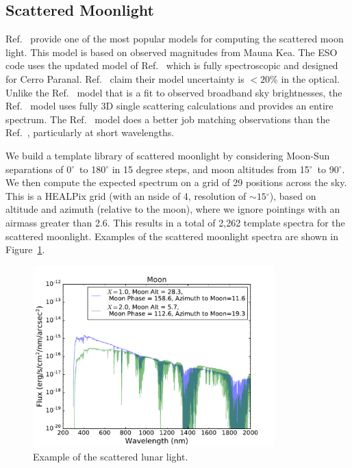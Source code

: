 \documentclass[]{spie}
\newcommand\degree{{^\circ}}
\begin{document}
\subsection{Scattered Moonlight}

Ref.~ provide one of the most popular models for computing the scattered moon light. This model is based on observed magnitudes from Mauna Kea. The ESO code uses the updated model of Ref.~ which is fully spectroscopic and designed for Cerro Paranal. Ref.~ claim their model uncertainty is $<20$\% in the optical.  Unlike the Ref.~ model that is a fit to observed broadband sky brightnesses, the Ref.~ model uses fully 3D single scattering calculations and provides an entire spectrum. The Ref.~ model does a better job matching observations than the Ref.~, particularly at short wavelengths.

We build a template library of scattered moonlight by considering Moon-Sun separations of 0$\degree$\ to 180$\degree$ in 15 degree steps, and moon altitudes from 15$\degree$\ to 90$\degree$.  We then compute the expected spectrum on a grid of 29 positions across the sky. This is a HEALPix grid (with an nside of 4, resolution of $\sim15\degree$), based on altitude and azimuth (relative to the moon), where we ignore pointings with an airmass greater than 2.6. This results in a total of 2,262 template spectra for the scattered moonlight. Examples of the scattered moonlight spectra are shown in Figure~\ref{fig:moon}.

\begin{figure}[ht]
  \begin{center}
  \includegraphics[height=7cm]{plots/moon.pdf}
  \end{center}
  \caption{Example of the scattered lunar light. \label{fig:moon}}
\end{figure}
\end{document}

